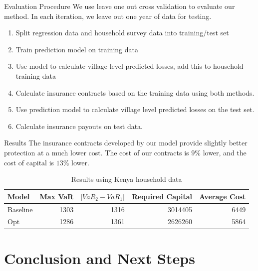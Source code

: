 \documentclass{beamer}
\begin{document}
\begin{frame}{Evaluation Procedure}
We use leave one out cross validation to evaluate our method. In each iteration, we leave out one year of data for testing.
\begin{enumerate}
    \item Split regression data and household survey data into training/test set
    \item Train prediction model on training data
    \item Use model to calculate village level predicted losses, add this to household training data
    \item Calculate insurance contracts based on the training data using both methods.
    \item Use prediction model to calculate village level predicted losses on the test set. 
    \item Calculate insurance payouts on test data.
\end{enumerate}
\end{frame}

\begin{frame}{Results}
The insurance contracts developed by our model provide slightly better protection at a much lower cost. The cost of our contracts is $9\%$ lower, and the cost of capital is $13\%$ lower. 
\begin{table}[]
\small
    \centering
    \begin{tabular}{lrrrr}
\toprule
    Model &  Max VaR &  $|VaR_2 - VaR_1|$ &  Required Capital &  Average Cost \\
\midrule
 Baseline &     1303 &               1316 &           3014405 &          6449 \\
      Opt &     1286 &               1361 &           2626260 &          5864 \\
\bottomrule
\end{tabular}
    \caption{Results using Kenya household data}
    
\end{table}
\end{frame}

\section{Conclusion and Next Steps}
\end{document}
